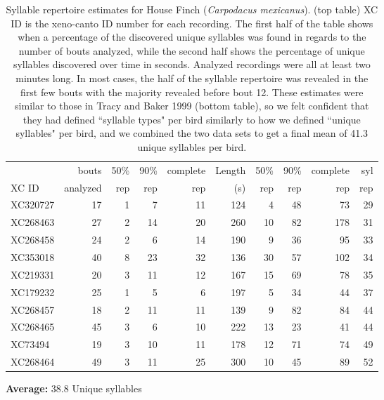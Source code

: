 \documentclass{article}
\begin{document}
  \begin{table}[H]
  \caption{Syllable repertoire estimates for House Finch (\textit{Carpodacus mexicanus}).  (top table) XC ID is the xeno-canto ID number for each recording.  The first half of the table shows when a percentage of the discovered unique syllables was found in regards to the number of bouts analyzed, while the second half shows the percentage of unique syllables discovered over time in seconds.  Analyzed recordings were all at least two minutes long. In most cases, the half of the syllable repertoire was revealed in the first few bouts with the majority revealed before bout 12. These estimates were similar to those in Tracy and Baker 1999 (bottom table), so we felt confident that they had defined ``syllable types" per bird similarly to how we defined ``unique syllables" per bird, and we combined the two data sets to get a final mean of 41.3 unique syllables per bird.}
  
  \begin{tabular}{|l|rrrr|rrrr|r|}
  \hline
  & bouts & 50\% & 90\% & complete & Length& 50\%  & 90\%  & complete  & syl \\
  XC ID & analyzed & rep & rep & rep & (s) & rep  & rep  & rep  & rep \\ 
  \hline
  XC320727 &  17 &   1 &   7 &  11 & 124 &   4 &  48 &  73 &  29 \\ 
  XC268463 &  27 &   2 &  14 &  20 & 260 &  10 &  82 & 178 &  31 \\ 
  XC268458 &  24 &   2 &   6 &  14 & 190 &   9 &  36 &  95 &  33 \\ 
  XC353018 &  40 &   8 &  23 &  32 & 136 &  30 &  57 & 102 &  34 \\ 
  XC219331 &  20 &   3 &  11 &  12 & 167 &  15 &  69 &  78 &  35 \\ 
  XC179232 &  25 &   1 &   5 &   6 & 197 &   5 &  34 &  44 &  37 \\ 
  XC268457 &  18 &   2 &  11 &  11 & 139 &   9 &  82 &  84 &  44 \\ 
  XC268465 &  45 &   3 &   6 &  10 & 222 &  13 &  23 &  41 &  44 \\ 
  XC73494 &  19 &   3 &  10 &  11 & 178 &  12 &  71 &  74 &  49 \\ 
  XC268464 &  49 &   3 &  11 &  25 & 300 &  10 &  45 &  89 &  52 \\ 
  \hline
  \end{tabular}
  \end{table}
  \textbf{Average:}	38.8 Unique syllables
  
\end{document}
